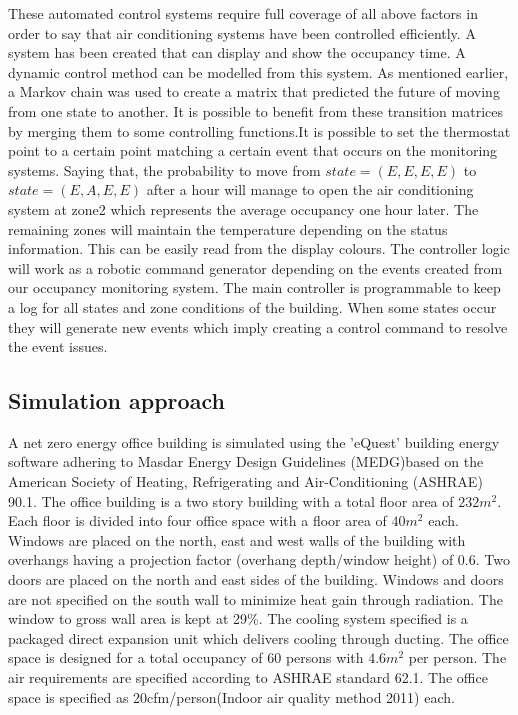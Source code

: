 These automated control systems require full coverage of all above factors in order to say that air conditioning systems have been controlled efficiently. A system has been created that can display and show the occupancy time. A dynamic control method can be modelled from this system. As mentioned earlier, a Markov chain was used to create a matrix that predicted the future of moving from one state to another.  It is possible to benefit from these transition matrices by merging them to some controlling functions.It is possible to set the thermostat point to a certain point matching a certain event that occurs on the monitoring systems. Saying that, the probability to move from $state= (E,E,E,E)$ to $state=(E,A,E,E)$ after a hour will manage to open the air conditioning system at zone2 which represents the average occupancy one hour later. The remaining zones will maintain the temperature depending on the status information. This can be easily read from the display colours. The controller logic will work as a robotic command generator depending on the events created from our occupancy monitoring system. The main controller is programmable to keep a log for all states and zone conditions of the building. When some states occur they will generate new events which imply creating a control command to resolve the event issues.


\subsection{Simulation approach}

A net zero energy office building is simulated using the 'eQuest' building energy software adhering to Masdar Energy Design Guidelines (MEDG)based on the American Society of Heating, Refrigerating and Air-Conditioning (ASHRAE) 90.1. The office building is a two story building with a total floor area of $232m^2$. Each floor is divided into four office space with a floor area of $40m^2$ each. Windows are placed on the north, east and west walls of the building with overhangs having a projection factor (overhang depth/window height) of $0.6$. Two doors are placed on the north and east sides of the building. Windows and doors are not specified on the south wall to minimize heat gain through radiation. The window to gross wall area is kept at 29\%. The cooling system specified is a packaged direct expansion unit which delivers cooling through ducting.
The office space is designed for a total occupancy of 60 persons with $4.6 m^2$ per person. The air requirements are specified according to ASHRAE standard 62.1. The office space is specified as 20cfm/person(Indoor air quality method 2011) each.

